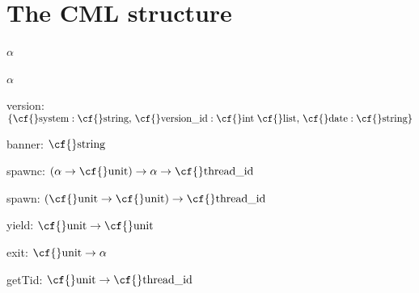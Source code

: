 \maybeclearpage
\section{The {\cf CML} structure}



\begin{synopsis}
\item {} \label{sig-CML}
\item {\STRUCTURE} \label{str-CML}
\end{synopsis}

\begin{interface}
\Nopagebreak
\item {}{} 
\Nopagebreak
\item {}{} \(\alpha\)~
\Nopagebreak
\item {}{} \(\alpha\)~
\Nopagebreak
\item {}{} {\cf version: \(\{\mbox{\cf{}system}:\mbox{\cf{}string},\,\mbox{\cf{}version\_id}:\mbox{\cf{}int}\;\mbox{\cf{}list},\,\mbox{\cf{}date}:\mbox{\cf{}string}\}\)}

\item {}{} {\cf banner: \(\mbox{\cf{}string}\)}

\Nopagebreak
\item {}{} {\cf spawnc: \((\alpha\rightarrow \mbox{\cf{}unit})\rightarrow \alpha\rightarrow \mbox{\cf{}thread\_id}\)}

\item {}{} {\cf spawn: \((\mbox{\cf{}unit}\rightarrow \mbox{\cf{}unit})\rightarrow \mbox{\cf{}thread\_id}\)}

\Nopagebreak
\item {}{} {\cf yield: \(\mbox{\cf{}unit}\rightarrow \mbox{\cf{}unit}\)}

\Nopagebreak
\item {}{} {\cf exit: \(\mbox{\cf{}unit}\rightarrow \alpha\)}

\Nopagebreak
\item {}{} {\cf getTid: \(\mbox{\cf{}unit}\rightarrow \mbox{\cf{}thread\_id}\)}


\end{interface}
